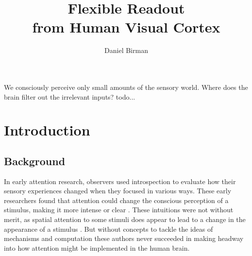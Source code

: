 \documentclass{report}
\begin{document}
\title{Flexible Readout\\
            from Human Visual Cortex}
\author{Daniel Birman}
 
\beforepreface
{}
We consciously perceive only small amounts of the sensory world. Where does the brain filter out the irrelevant inputs? 
todo...
\afterpreface

\chapter{Introduction}

\section{Background}
In early attention research, observers used introspection to evaluate how their sensory experiences changed when they focused in various ways. These early researchers found that attention could change the conscious perception of a stimulus, making it more intense or clear \cite{Helmholtz1924-rl,James1981-cj,Kuelpe1902-qz,Titchener1908-bx}. These intuitions were not without merit, as spatial attention to some stimuli does appear to lead to a change in the appearance of a stimulus \cite{Carrasco2018-sb}. But without concepts to tackle the ideas of mechanisms and computation these authors never succeeded in making headway into how attention might be implemented in the human brain. 
\end{document}
